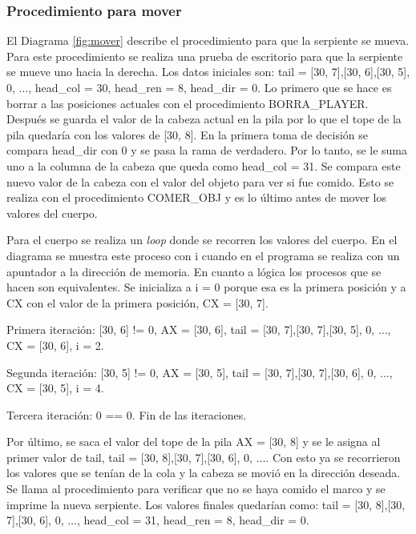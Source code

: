 \documentclass[12pt]{article}
\begin{document}
\subsubsection*{Procedimiento para mover}
El Diagrama \ref{fig:mover} describe el procedimiento para que la serpiente se mueva. Para este procedimiento se realiza una prueba de escritorio para que la serpiente se mueve uno hacia la derecha. Los datos iniciales son: tail = [30, 7],[30, 6],[30, 5], 0, $\dots$, head\_col = 30, head\_ren = 8, head\_dir = 0. Lo primero que se hace es borrar a las posiciones actuales con el procedimiento BORRA\_PLAYER. Después se guarda el valor de la cabeza actual en la pila por lo que el tope de la pila quedaría con los valores de [30, 8]. En la primera toma de decisión se compara head\_dir con 0 y se pasa la rama de verdadero. Por lo tanto, se le suma uno a la columna de la cabeza que queda como head\_col = 31. Se compara este nuevo valor de la cabeza con el valor del objeto para ver si fue comido. Esto se realiza con el procedimiento COMER\_OBJ y es lo último antes de mover los valores del cuerpo.

Para el cuerpo se realiza un \textit{loop} donde se recorren los valores del cuerpo. En el diagrama se muestra este proceso con i cuando en el programa se realiza con un apuntador a la dirección de memoria. En cuanto a lógica los procesos que se hacen son equivalentes. Se inicializa a i = 0 porque esa es la primera posición y a CX con el valor de la primera posición, CX = [30, 7]. 

Primera iteración: [30, 6] != 0, AX = [30, 6], tail = [30, 7],[30, 7],[30, 5], 0, $\dots$, CX = [30, 6], i = 2.

Segunda iteración: [30, 5] != 0, AX = [30, 5], tail = [30, 7],[30, 7],[30, 6], 0, $\dots$, CX = [30, 5], i = 4.

Tercera iteración: 0 == 0. Fin de las iteraciones.

Por último, se saca el valor del tope de la pila AX = [30, 8] y se le asigna al primer valor de tail, tail = [30, 8],[30, 7],[30, 6], 0, $\dots$. Con esto ya se recorrieron los valores que se tenían de la cola y la cabeza se movió en la dirección deseada. Se llama al procedimiento para verificar que no se haya comido el marco y se imprime la nueva serpiente. Los valores finales quedarían como: tail = [30, 8],[30, 7],[30, 6], 0, $\dots$, head\_col = 31, head\_ren = 8, head\_dir = 0. 
\end{document}

